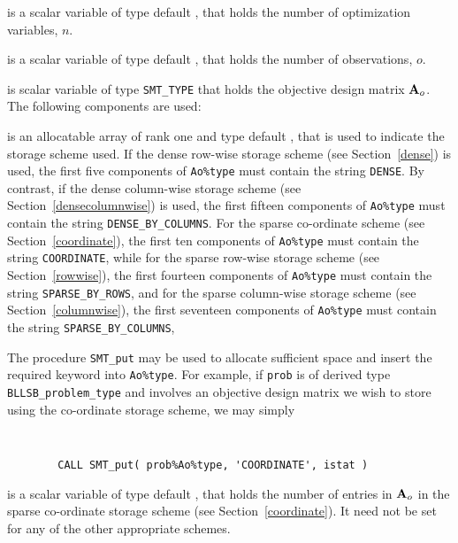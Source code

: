 \documentclass{galahad}
\newcommand{\packagename}{BLLSB}
\begin{document}
\begin{description}

 is a scalar variable of type default \integer,
 that holds the number of optimization variables, $n$.

 is a scalar variable of type default \integer,
 that holds the number of observations, $o$.

 is scalar variable of type {\tt SMT\_TYPE}
that holds the objective design matrix ${\mathbf{A}}_o$.
The following components are used:

\begin{description}

 is an allocatable array of rank one and type default \character,
that is used to indicate the storage scheme used.
If the dense row-wise storage scheme (see Section~\ref{dense}) is used,
the first five components of {\tt Ao\%type} must contain the
string {\tt DENSE}.
By contrast, if the dense column-wise storage scheme
(see Section~\ref{densecolumnwise}) is used,
the first fifteen components of {\tt Ao\%type} must contain the
string {\tt DENSE\_BY\_COLUMNS}.
For the sparse co-ordinate scheme (see Section~\ref{coordinate}),
the first ten components of {\tt Ao\%type} must contain the
string {\tt COORDINATE}, while
for the sparse row-wise storage scheme (see Section~\ref{rowwise}),
the first fourteen components of {\tt Ao\%type} must contain the
string {\tt SPARSE\_BY\_ROWS},
and for the sparse column-wise storage scheme (see Section~\ref{columnwise}),
the first seventeen components of {\tt Ao\%type} must contain the
string {\tt SPARSE\_BY\_COLUMNS},

The procedure {\tt SMT\_put} may be used to allocate sufficient space and
insert the required keyword into {\tt Ao\%type}. For example,
if {\tt prob} is of derived type {\tt \packagename\_problem\_type}
and involves an objective design matrix we wish to store using the co-ordinate
storage scheme, we may simply
{\tt
\begin{verbatim}
        CALL SMT_put( prob%Ao%type, 'COORDINATE', istat )
\end{verbatim}
}
\noindent

 is a scalar variable of type default \integer, that
holds the number of entries in ${\mathbf{A}}_o$
in the sparse co-ordinate storage scheme (see Section~\ref{coordinate}).
It need not be set for any of the other appropriate schemes.


\end{description}
\end{description}
\end{document}
